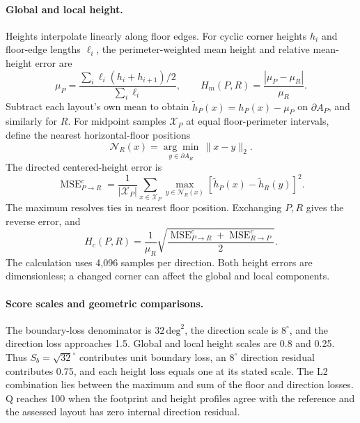 \paragraph{Global and local height.}
Heights interpolate linearly along floor edges. For cyclic corner heights \(h_i\) and floor-edge lengths \(\ell_i\), the perimeter-weighted mean height and relative mean-height error are
\begin{equation}
 \mu_P=\frac{\sum_i\ell_i(h_i+h_{i+1})/2}{\sum_i\ell_i},
 \qquad H_m(P,R)=\frac{|\mu_P-\mu_R|}{\mu_R}.
 \label{eq:supp-height-mean}
\end{equation}
Subtract each layout's own mean to obtain \(\widetilde h_P(x)=h_P(x)-\mu_P\) on \(\partial A_P\), and similarly for \(R\). For midpoint samples \(\mathcal X_P\) at equal floor-perimeter intervals, define the nearest horizontal-floor positions
\begin{equation}
 \mathcal N_R(x)=\underset{y\in\partial A_R}{\arg\min}\,\|x-y\|_2.
 \label{eq:supp-nearest-floor-set}
\end{equation}
The directed centered-height error is
\begin{equation}
 \operatorname{MSE}^{c}_{P\rightarrow R}
 =\frac{1}{|\mathcal X_P|}\sum_{x\in\mathcal X_P}
 \max_{y\in\mathcal N_R(x)}
 [\widetilde h_P(x)-\widetilde h_R(y)]^2.
 \label{eq:supp-height-directed}
\end{equation}
The maximum resolves ties in nearest floor position. Exchanging \(P,R\) gives the reverse error, and
\begin{equation}
 H_c(P,R)=\frac1{\mu_R}
 \sqrt{\frac{\operatorname{MSE}^{c}_{P\rightarrow R}
 +\operatorname{MSE}^{c}_{R\rightarrow P}}2}.
 \label{eq:supp-height-center}
\end{equation}
The calculation uses 4,096 samples per direction. Both height errors are dimensionless; a changed corner can affect the global and local components.

\paragraph{Score scales and geometric comparisons.}
The boundary-loss denominator is \(32\,\mathrm{deg}^2\), the direction scale is \(8^\circ\), and the direction loss approaches 1.5. Global and local height scales are 0.8 and 0.25. Thus \(S_b=\sqrt{32}^\circ\) contributes unit boundary loss, an \(8^\circ\) direction residual contributes 0.75, and each height loss equals one at its stated scale. The L2 combination lies between the maximum and sum of the floor and direction losses. Q reaches 100 when the footprint and height profiles agree with the reference and the assessed layout has zero internal direction residual.

